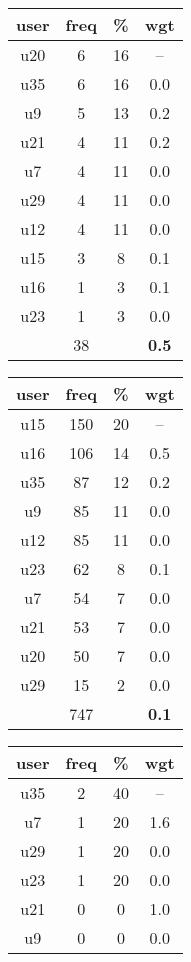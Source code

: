 \begin{appendices}
\begin{table}
\centering
\begin{tabular}{ |c|c|c|c| }
	\hline
	\textbf{user} & \textbf{freq} & \textbf{\%} & \textbf{wgt} \\
	\hline
	u20 & 6 & 16 & -- \\
	u35 & 6 & 16 & 0.0 \\
	u9 & 5 & 13 & 0.2 \\
	u21 & 4 & 11 & 0.2 \\
	u7 & 4 & 11 & 0.0 \\
	u29 & 4 & 11 & 0.0 \\
	u12 & 4 & 11 & 0.0 \\
	u15 & 3 & 8 & 0.1 \\
	u16 & 1 & 3 & 0.1 \\
	u23 & 1 & 3 & 0.0 \\
	 & 38 & & \textbf{0.5} \\
	\hline
\end{tabular}
\begin{tabular}{ |c|c|c|c| }
	\hline
	\textbf{user} & \textbf{freq} & \textbf{\%} & \textbf{wgt} \\
	\hline
	u15 & 150 & 20 & -- \\
	u16 & 106 & 14 & 0.5 \\
	u35 & 87 & 12 & 0.2 \\
	u9 & 85 & 11 & 0.0 \\
	u12 & 85 & 11 & 0.0 \\
	u23 & 62 & 8 & 0.1 \\
	u7 & 54 & 7 & 0.0 \\
	u21 & 53 & 7 & 0.0 \\
	u20 & 50 & 7 & 0.0 \\
	u29 & 15 & 2 & 0.0 \\
	 & 747 & & \textbf{0.1} \\
	\hline
\end{tabular}
\begin{tabular}{ |c|c|c|c| }
	\hline
	\textbf{user} & \textbf{freq} & \textbf{\%} & \textbf{wgt} \\
	\hline
	u35 & 2 & 40 & -- \\
	u7 & 1 & 20 & 1.6 \\
	u29 & 1 & 20 & 0.0 \\
	u23 & 1 & 20 & 0.0 \\
	u21 & 0 & 0 & 1.0 \\
	u9 & 0 & 0 & 0.0 \\

\end{tabular}
\end{table}
\end{appendices}

